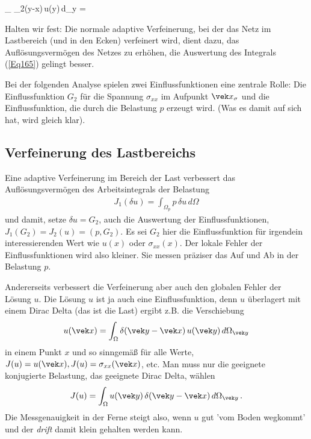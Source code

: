 {{{ \int_{\Omega} \delta_2(\vek y-\vek x)\,u(\vek y)\,d\Omega_{\vek y} =

 Halten wir fest: Die normale adaptive Verfeinerung, bei der das Netz im Lastbereich (und in den Ecken) verfeinert wird, dient dazu, das Aufl\"{o}sungsverm\"{o}gen des Netzes zu erh\"{o}hen, die Auswertung des Integrals (\ref{Eq165}) gelingt besser.


Bei der folgenden Analyse spielen zwei Einflussfunktionen eine zentrale Rolle: Die Einflussfunktion $G_2$ f\"{u}r die Spannung $\sigma_{xx}$ im Aufpunkt $\vek x_\sigma$ und die Einflussfunktion, die durch die Belastung $p$ erzeugt wird. (Was es damit auf sich hat, wird gleich klar).

{\textcolor{blau2}{\subsection*{Verfeinerung des Lastbereichs}}}
Eine adaptive Verfeinerung im Bereich der Last verbessert das Aufl\"{o}sungsverm\"{o}gen des Arbeitsintegrals der Belastung
\begin{align}
J_1(\delta u) = \int_{\Omega_p} p\,\delta u \,d\Omega
\end{align}
und damit, setze $\delta u= G_2$, auch die Auswertung der Einflussfunktionen, $J_1(G_2) = J_2(u) = (p, G_2)$. Es sei $G_2$ hier die Einflussfunktion f\"{u}r irgendein interessierenden Wert wie $u(x)$ oder $\sigma_{xx}(x)$. Der lokale Fehler der Einflussfunktionen wird also kleiner. Sie messen pr\"{a}ziser das Auf und Ab in der Belastung $p$.

Andererseits verbessert die Verfeinerung aber auch den globalen Fehler der L\"{o}sung $u$. Die L\"{o}sung $u$ ist ja auch eine Einflussfunktion, denn $u$ \"{u}berlagert mit einem Dirac Delta (das ist die  Last) ergibt z.B. die Verschiebung
\begin{align}
u(\vek x) = \int_{\Omega} \delta(\vek y -\vek x)\,u(\vek y)\,d\Omega_{\vek y}
\end{align}
in einem Punkt $x$ und so sinngem\"{a}{\ss} f\"{u}r alle Werte, $J(u) = u(\vek x), J(u) = \sigma_{xx}(\vek x)$, etc. Man muss nur die geeignete konjugierte Belastung, das geeignete Dirac Delta, w\"{a}hlen
\begin{align}
J(u) = \int_{\Omega} u(\vek y)\,\delta(\vek y-\vek x) \,d\Omega_{\vek y}\,.
\end{align}
Die Messgenauigkeit in der Ferne steigt also, wenn $u$ gut 'vom Boden wegkommt' und der {\em drift\/} damit klein gehalten werden kann.

}}}
